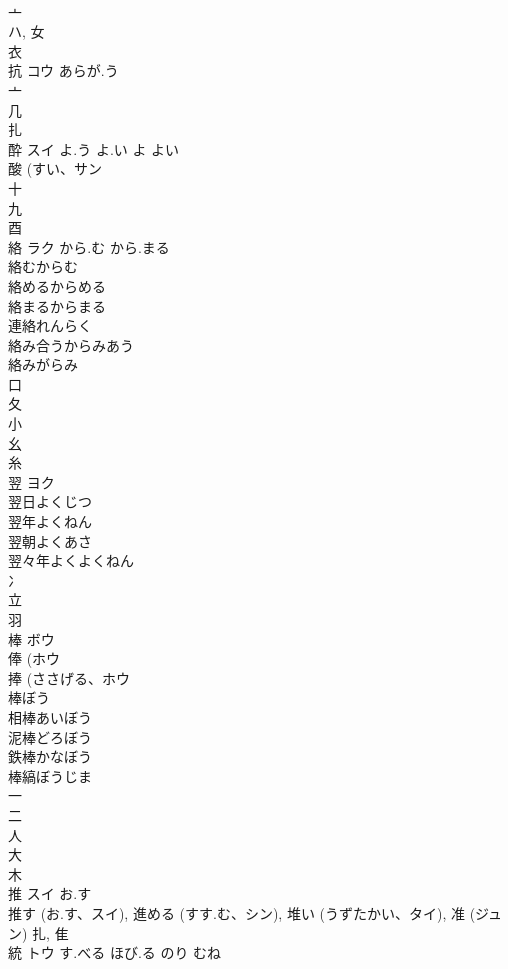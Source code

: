 \documentclass[8pt]{extreport}
\begin{document}
\begin{CJK}{UTF8}{min}
\\	亠 
\\	ハ, 女 
\\	衣 
\\	抗	コウ	あらが.う	
\\	亠 
\\	几 
\\	扎	
\\	酔	スイ	よ.う よ.い よ よい	
\\	酸 (すい、サン 
\\	十 
\\	九 
\\	酉 
\\	絡	ラク	から.む から.まる	
\\	絡むからむ
\\	絡めるからめる
\\	絡まるからまる
\\	連絡れんらく
\\	絡み合うからみあう
\\	絡みがらみ
\\	口 
\\	夂 
\\	小 
\\	幺 
\\	糸 
\\	翌	ヨク		
\\	翌日よくじつ 
\\	翌年よくねん 
\\	翌朝よくあさ 
\\	翌々年よくよくねん 
\\	冫 
\\	立 
\\	羽 
\\	棒	ボウ		
\\	俸 (ホウ 
\\	捧 (ささげる、ホウ 
\\	棒ぼう
\\	相棒あいぼう
\\	泥棒どろぼう
\\	鉄棒かなぼう
\\	棒縞ぼうじま
\\	一 
\\	二 
\\	人 
\\	大 
\\	木 
\\	推	スイ	お.す	
\\	推す (お.す、スイ), 進める (すす.む、シン), 堆い (うずたかい、タイ), 准 (ジュン)			扎, 隹 
\\	統	トウ	す.べる ほび.る のり むね	

\end{CJK}
\end{document}
